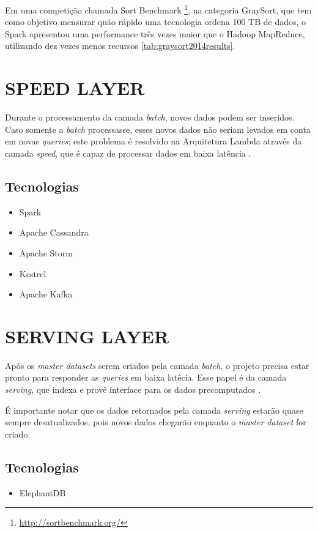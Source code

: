 Em uma competição chamada Sort
Benchmark \footnote{\url{http://sortbenchmark.org/}}, na categoria GraySort,
que tem como objetivo mensurar quão rápido uma tecnologia ordena 100 TB de
dados, o Spark apresentou uma performance três vezes maior que o Hadoop
MapReduce, utilizando dez vezes menos recursos \ref{tab:graysort2014results}.

\section{SPEED LAYER}

Durante o processamento da camada \textit{batch}, novos dados podem ser
inseridos. Caso somente a \textit{batch} processasse, esses novos dados não
seriam levados em conta em novas \textit{queries}; este problema é resolvido
na Arquitetura Lambda através da camada \textit{speed}, que é capaz de
processar dados em baixa latência \cite{marz2015}.

\subsection{Tecnologias}

\begin{itemize}
  \item Spark
  \item Apache Cassandra
  \item Apache Storm
  \item Kestrel
  \item Apache Kafka
\end{itemize}

\section{SERVING LAYER}

Após os \textit{master datasets} serem criados pela camada \textit{batch}, o
projeto precisa estar pronto para responder as \textit{queries} em baixa
latêcia. Esse papel é da camada \textit{serving}, que indexa e provê interface
para os dados precomputados \cite{marz2015}.

É importante notar que os dados retornados pela camada \textit{serving} estarão
quase sempre desatualizados, pois novos dados chegarão enquanto o
\textit{master dataset} for criado.

\subsection{Tecnologias}

\begin{itemize}
    \item ElephantDB
\end{itemize}
